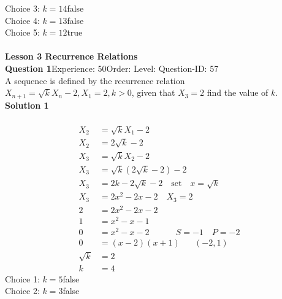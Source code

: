 \documentclass{article}
\begin{document}
Choice 3: \hspace{20pt}$k=14$\hspace{20pt}false\\
Choice 4: \hspace{20pt}$k=13$\hspace{20pt}false\\
Choice 5: \hspace{20pt}$k=12$\hspace{20pt}true\\
\\[4pt]
\noindent\huge{\textbf{Lesson 3 Recurrence Relations}}\\[12pt]
\noindent\textbf{Question 1}\hspace{20pt}Experience: 50\hspace{20pt}Order: \hspace{20pt}Level: \hspace{20pt}Question-ID: 57\\[2pt]
A sequence is defined by the recurrence relation $X_{n+1}=\sqrt{k}X_n-2, X_1=2,k>0$, given that $X_3=2$ find the value of $k$.\\[4pt]
\noindent\textbf{Solution 1}\\[2pt]
\\[-35pt]\begin{align*}
X_2&=\sqrt{k}X_1-2\\[2pt]
X_2&=2\sqrt{k}-2\\[12pt]
X_3&=\sqrt{k}X_2-2\\[2pt]
X_3&=\sqrt{k}(2\sqrt{k}-2)-2\\[2pt]
X_3&=2k-2\sqrt{k}-2\quad \text{set}\quad x=\sqrt{k}\\[2pt]
X_3&=2x^2-2x-2 \quad X_3=2\\[2pt]
2&=2x^2-2x-2\\[2pt]
1&=x^2-x-1\\[2pt]
0&=x^2-x-2 \hspace{37pt} S=-1 \quad P=-2\\[2pt]
0&=(x-2)(x+1)\hspace{20pt} (-2,1)\\[2pt]
\sqrt{k}&=2\\[2pt]
k&=4
\end{align*}
Choice 1: \hspace{20pt}$k=5$\hspace{20pt}false\\
Choice 2: \hspace{20pt}$k=3$\hspace{20pt}false\\
\end{document}
